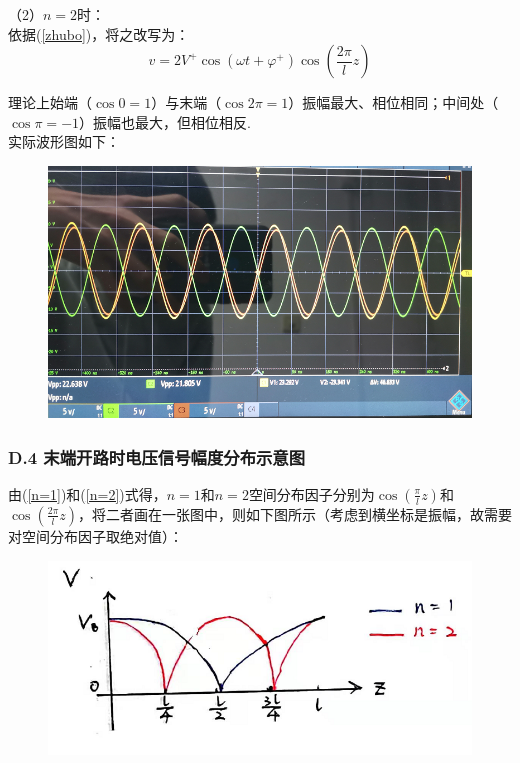 \documentclass[UTF8]{ctexart}
\begin{document}
（2）$n=2$时：\\

依据(\ref{zhubo})，将之改写为：
\begin{equation}
    v=2V^+\cos(\omega t+\varphi^+)\cos(\frac{2\pi}{l}z)
    \label{n=2}
\end{equation}\par
理论上始端（$\cos{0}=1$）与末端（$\cos{2\pi}=1$）振幅最大、相位相同；中间处（$\cos{\pi}=-1$）振幅也最大，但相位相反.\\
实际波形图如下：

\begin{figure}[H]\begin{center}
    \includegraphics[scale=0.7]{22.PNG}
\end{center}\end{figure}


\subsubsection*{D.4 末端开路时电压信号幅度分布示意图}
由(\ref{n=1})和(\ref{n=2})式得，$n=1$和$n=2$空间分布因子分别为$\cos(\frac{\pi}{l}z)$和$\cos(\frac{2\pi}{l}z)$，将二者画在一张图中，则如下图所示（考虑到横坐标是振幅，故需要对空间分布因子取绝对值）：

\begin{figure}[H]\begin{center}
    \includegraphics[scale=0.6]{18.PNG}
\end{center}\end{figure}
\end{document}
